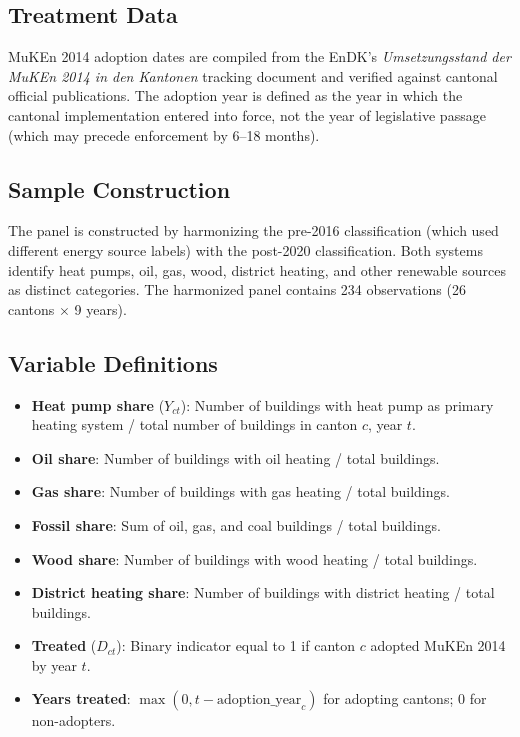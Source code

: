 \documentclass[12pt]{article}
\begin{document}
\subsection{Treatment Data}

MuKEn 2014 adoption dates are compiled from the EnDK's \textit{Umsetzungsstand der MuKEn 2014 in den Kantonen} tracking document \citep{endk2023umsetzungsstand} and verified against cantonal official publications. The adoption year is defined as the year in which the cantonal implementation entered into force, not the year of legislative passage (which may precede enforcement by 6--18 months).

\subsection{Sample Construction}

The panel is constructed by harmonizing the pre-2016 classification (which used different energy source labels) with the post-2020 classification. Both systems identify heat pumps, oil, gas, wood, district heating, and other renewable sources as distinct categories. The harmonized panel contains 234 observations (26 cantons $\times$ 9 years).

\subsection{Variable Definitions}

\begin{itemize}
    \item \textbf{Heat pump share} ($Y_{ct}$): Number of buildings with heat pump as primary heating system / total number of buildings in canton $c$, year $t$.
    \item \textbf{Oil share}: Number of buildings with oil heating / total buildings.
    \item \textbf{Gas share}: Number of buildings with gas heating / total buildings.
    \item \textbf{Fossil share}: Sum of oil, gas, and coal buildings / total buildings.
    \item \textbf{Wood share}: Number of buildings with wood heating / total buildings.
    \item \textbf{District heating share}: Number of buildings with district heating / total buildings.
    \item \textbf{Treated} ($D_{ct}$): Binary indicator equal to 1 if canton $c$ adopted MuKEn 2014 by year $t$.
    \item \textbf{Years treated}: $\max(0, t - \text{adoption\_year}_c)$ for adopting cantons; 0 for non-adopters.
\end{itemize}
\end{document}
